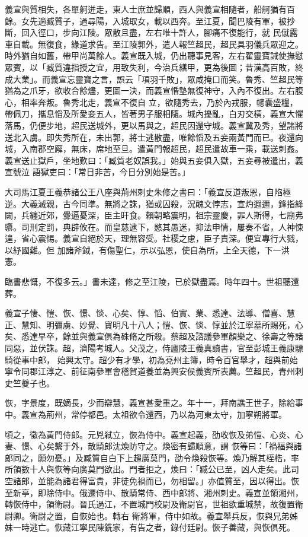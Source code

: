 \begin{pinyinscope}
 義宣與質相失，各單舸迸走，東人士庶並歸順，西人與義宣相隨者，船舸猶有百餘。女先適臧質子，過尋陽，入城取女，載以西奔。至江夏，聞巴陵有軍，被抄斷，回入徑口，步向江陵。眾散且盡，左右唯十許人，腳痛不復能行，就
 民僦露車自載。無復食，緣道求告。至江陵郭外，遣人報竺超民，超民具羽儀兵眾迎之。時外猶自如舊，帶甲尚萬餘人。義宣既入城，仍出聽事見客，左右翟靈寶誡使撫慰眾賓，以「臧質違指授之宜，用致失利，今治兵繕甲，更為後圖；昔漢高百敗，終成大業」。而義宣忘靈寶之言，誤云「項羽千敗」，眾咸掩口而笑。魯秀、竺超民等猶為之爪牙，欲收合餘燼，更圖一決，而義宣惛墊無復神守，入內不復出。左右腹心，相率奔叛。魯秀北走，義宣不復自
 立，欲隨秀去，乃於內戎服，幰囊盛糧，帶佩刀，攜息慆及所愛妾五人，皆著男子服相隨。城內擾亂，白刃交橫，義宣大懼落馬，仍便步地，超民送城外，更以馬與之，超民因還守城。義宣冀及秀，望諸將送北入虜。即失秀所在，未出郭，將士逃散盡，唯餘慆及五妾兩黃門而已。夜還向城，入南郡空廨，無床，席地至旦。遣黃門報超民，超民遣故車一乘，載送刺姦。義宣送止獄戶，坐地歎曰：「臧質老奴誤我。」始與五妾俱入獄，五妾尋被遣出，義宣號泣
 語獄吏曰：「常日非苦，今日分別始是苦。」



 大司馬江夏王義恭諸公王八座與荊州刺史朱修之書曰：「義宣反道叛恩，自陷極逆。大義滅親，古今同準。無將之誅，猶或囚殺，況醜文悖志，宣灼遐邇，鋒指絳闕，兵纏近郊，釁逼憂深，臣主旰食。賴朝略震明，祖宗靈慶，罪人斯得，七廟弗隳。司刑定罰，典辟攸在。而皇慈逮下，愍其愚迷，抑法申情，屢奏不省，人神悚遑，省心震惕。義宣自絕於天，理無容受。社稷之慮，臣子責深。便宜專行大戮，以紓國難。但
 加諸斧鉞，有傷聖仁，示以弘恩，使自為所，上全天德，下一洪憲。



 臨書悲慨，不復多云。」書未達，修之至江陵，已於獄盡焉。時年四十。世祖聽還葬。



 義宣子悽、愷、恢、憬、惔、心矣、惇、慆、伯實、業、悉達、法導、僧喜、慧正、慧知、明彌虜、妙覺、寶明凡十八人；愷、恢、惔、惇並於江寧墓所賜死，心矣、悉達早卒，餘並與義宣俱為硃脩之所殺。蔡超及諮議參軍顏樂之、徐壽之等諸同惡，並伏誅。超，濟陽考城人。父茂之，侍廬陵王義真讀書，官至彭城王義康驃騎從事中郎，
 始興太守。超少有才學，初為兗州主簿，時令百官舉才，超與前始寧令同郡江淳之、前征南參軍會稽賀道養並為興安侯義賓所表薦。竺超民，青州刺史竺夔子也。



 恢，字景度，既嫡長，少而辯慧，義宣甚愛重之。年十一，拜南譙王世子，除給事中。義宣為荊州，常停都邑。太祖欲令還西，乃以為河東太守，加寧朔將軍。



 頃之，徵為黃門侍郎。元兇弒立，恢為侍中。義宣起義，劭收恢及弟愷、心炎、心妻、憬、心矣繫于外，散騎郎沈煥防守之。煥密有歸順意，謂
 恢等曰：「禍福與諸郎同之，願勿憂。」及臧質自白下上趨廣莫門，劭令煥殺恢等。煥乃解其桎梏，率所領數十人與恢等向廣莫門欲出。門者拒之，煥曰：「臧公已至，凶人走矣。此司空諸郎，並能為諸君得富貴，非徒免禍而已，勿相留。」亦值質至，因以得出。恢至新亭，即除侍中。俄遷侍中、散騎常侍、西中郎將、湘州刺史。義宣並領湘州，轉恢侍中，領衛尉。晉氏過江，不置城門校尉及衛尉官，世祖欲重城禁，故復置衛尉卿。衛尉之置，自恢始也。轉右
 衛將軍，侍中如故。義宣舉兵反，恢與兄弟姊妹一時逃亡。恢藏江寧民陳銑家，有告之者，錄付廷尉。恢子善藏，與恢俱死。




\end{pinyinscope}
